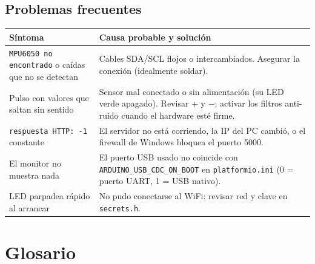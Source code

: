\documentclass[11pt,a4paper]{article}
\begin{document}
\subsection{Problemas frecuentes}

\begin{center}
\begin{tabular}{@{}>{\raggedright\arraybackslash}p{5.2cm} >{\raggedright\arraybackslash}p{9.7cm}@{}}
\toprule
\textbf{Síntoma} & \textbf{Causa probable y solución}\\
\midrule
\texttt{MPU6050 no encontrado} o caídas que no se detectan & Cables SDA/SCL flojos o intercambiados. Asegurar la conexión (idealmente soldar).\\
Pulso con valores que saltan sin sentido & Sensor mal conectado o sin alimentación (su LED verde apagado). Revisar + y $-$; activar los filtros anti-ruido cuando el hardware esté firme.\\
\texttt{respuesta HTTP: -1} constante & El servidor no está corriendo, la IP del PC cambió, o el firewall de Windows bloquea el puerto 5000.\\
El monitor no muestra nada & El puerto USB usado no coincide con \texttt{ARDUINO\_USB\_CDC\_ON\_BOOT} en \texttt{platformio.ini} (0 = puerto UART, 1 = USB nativo).\\
LED parpadea rápido al arrancar & No pudo conectarse al WiFi: revisar red y clave en \texttt{secrets.h}.\\
\bottomrule
\end{tabular}
\end{center}

\section{Glosario}
\end{document}
